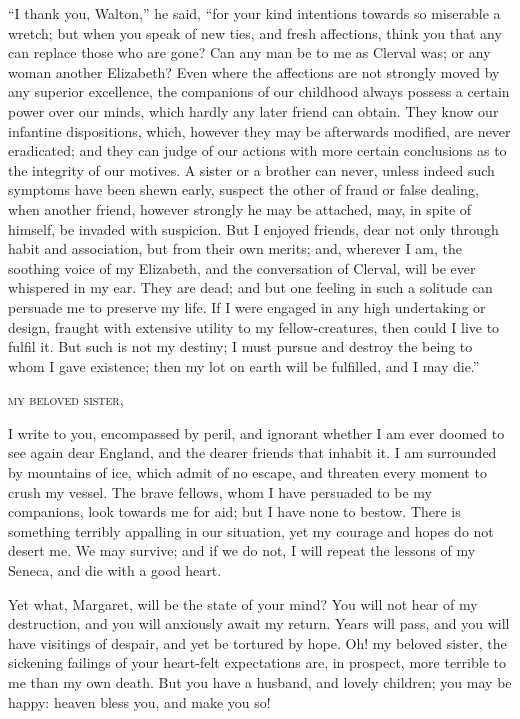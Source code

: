 ``I thank you, Walton,'' he said,
``for your kind intentions towards so
miserable a wretch; but when you
speak of new ties, and fresh affections,
think you that any can replace those
who are gone? Can any man be to
me as Clerval was; or any woman
another Elizabeth? Even where the
affections are not strongly moved by any
superior excellence, the companions of
our childhood always possess a certain
power over our minds, which hardly
any later friend can obtain. They
know our infantine dispositions, which,
however they may be afterwards modified,
are never eradicated; and they
can judge of our actions with more
certain conclusions as to the integrity
of our motives. A sister or a brother
can never, unless indeed such symptoms
have been shewn early, suspect
the other of fraud or false dealing,
when another friend, however strongly
he may be attached, may, in spite of
himself, be invaded with suspicion.
But I enjoyed friends, dear not only
through habit and association, but from
their own merits; and, wherever I am,
the soothing voice of my Elizabeth,
and the conversation of Clerval, will
be ever whispered in my ear. They
are dead; and but one feeling in such
a solitude can persuade me to preserve
my life. If I were engaged in any
high undertaking or design, fraught
with extensive utility to my fellow-creatures,
then could I live to fulfil it.
But such is not my destiny; I must pursue
and destroy the being to whom I
gave existence; then my lot on earth
will be fulfilled, and I may die.''

\bigskip
{}

\noindent\textsc{my beloved sister},

I write to you, encompassed by
peril, and ignorant wh\-ether I am ever
doomed to see again dear England, and
the dearer friends that inhabit it. I
am surrounded by mountains of ice,
which admit of no escape, and threaten
every moment to crush my vessel. The
brave fellows, whom I have persuaded
to be my companions, look towards me
for aid; but I have none to bestow.
There is something terribly appalling
in our situation, yet my courage and
hopes do not desert me. We may
survive; and if we do not, I will repeat
the lessons of my Seneca, and die with
a good heart.

Yet what, Margaret, will be the
state of your mind? You will not hear
of my destruction, and you will anxiously
await my return. Years will
pass, and you will have visitings of
despair, and yet be tortured by hope.
Oh! my beloved sister, the sickening
failings of your heart-felt expectations
are, in prospect, more terrible to me
than my own death. But you have a
husband, and lovely children; you
may be happy: heaven bless you, and
make you so!

